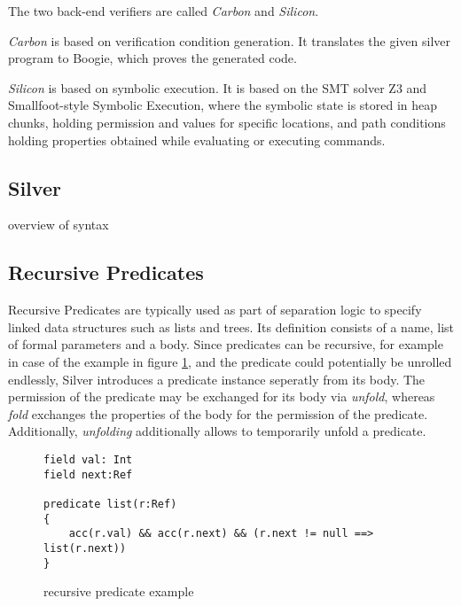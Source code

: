 \documentclass[12pt]{article}
\begin{document}
The two back-end verifiers are called \textit{Carbon} and \textit{Silicon}. 

\textit{Carbon}  is based on verification condition generation. It translates the given silver program to Boogie\cite{leino2008boogie}, which proves the generated code.%

\textit{Silicon} is based on symbolic execution. It is based on the SMT solver Z3\cite{de2008z3} and Smallfoot-style Symbolic Execution\cite{berdine2005smallfoot}, where the symbolic state is stored in heap chunks, holding permission and values for specific locations, and path conditions holding properties obtained while evaluating or executing commands.

\subsection{Silver}
overview of syntax

\subsection{Recursive Predicates}

Recursive Predicates\cite{parkinson2005separation} are typically used as part of separation logic to specify linked data structures such as lists and trees. Its definition consists of a name,  list of formal parameters and a body. 
Since predicates can be recursive, for example in case of the example in figure \ref{rec}, and the predicate could potentially be unrolled endlessly, Silver introduces a predicate instance seperatly from its body.
The permission of the predicate may be exchanged for its body via \textit{unfold}, whereas \textit{fold} exchanges the properties of the body for the permission of the predicate. Additionally, \textit{unfolding} additionally allows to temporarily unfold a predicate.

\begin{figure}[h]
  \centering
\begin{lstlisting}
field val: Int
field next:Ref

predicate list(r:Ref)
{
    acc(r.val) && acc(r.next) && (r.next != null ==> list(r.next))
}
\end{lstlisting}
\caption[recursive predicate]
   {recursive predicate example}
\label{rec}
\end{figure}
\end{document}
